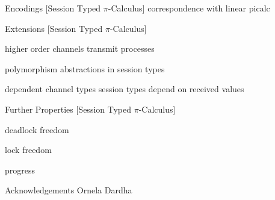 \documentclass[dvipsnames]{beamer}
\newcommand{\Picalc}{$\pi$-Calculus}
\newcommand{\slidetitle}[2]{#2 \hspace*{\fill} [#1]}
\begin{document}
  \begin{frame}{\slidetitle{Session Typed \Picalc{}}{Encodings}}
    correspondence with linear picalc
  \end{frame}

  \begin{frame}{\slidetitle{Session Typed \Picalc{}}{Extensions}}
    \begin{block}{higher order}
      channels transmit processes
    \end{block}
    \begin{block}{polymorphism}
      abstractions in session types
    \end{block}
    \begin{block}{dependent channel types}
      session types depend on received values
    \end{block}
  \end{frame}

  \begin{frame}{\slidetitle{Session Typed \Picalc{}}{Further Properties}}
    \begin{block}{deadlock freedom}

    \end{block}
    \begin{block}{lock freedom}
    \end{block}
    \begin{block}{progress}
    \end{block}
  \end{frame}

  \begin{frame}{Acknowledgements}
    Ornela Dardha
  \end{frame}
\end{document}

